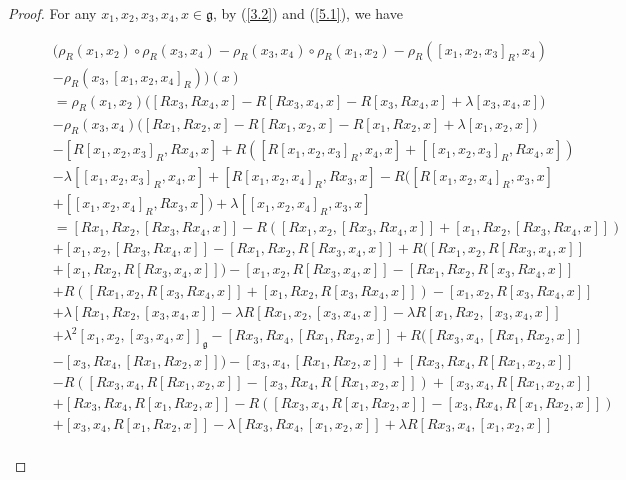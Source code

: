 \documentclass[12pt]{amsart}
\theoremstyle{definition}
\begin{document}
\begin{proof}
For any $x_1, x_2, x_3, x_4, x\in \mathfrak{g}$, by (\ref{3.2}) and (\ref{5.1}),   we have
\begin{small}
\begin{align*}
&\big(\rho_R(x_1, x_2)\circ\rho_R(x_3, x_4)-\rho_R(x_3, x_4)\circ \rho_R(x_1, x_2)-\rho_R([x_1, x_2, x_3]_R, x_4)\\
\quad\quad &-\rho_R(x_3, [x_1, x_2, x_4]_R)\big)(x)\\
&=\rho_R(x_1, x_2)\big([Rx_3,Rx_4, x]-R[Rx_3, x_4, x]-R[x_3, Rx_4, x]+\lambda[x_3, x_4, x]\big)\\
\quad\quad &-\rho_R(x_3, x_4)\big([Rx_1,Rx_2, x]-R[Rx_1, x_2, x]-R[x_1, Rx_2, x]+\lambda[x_1, x_2, x]\big)\\
\quad\quad & -[R[x_1,x_2,x_3]_R, Rx_4, x]+R( [R[x_1,x_2,x_3]_R, x_4, x]+[[x_1, x_2, x_3]_R, Rx_4, x]) \\
\quad\quad &-\lambda [[x_1,x_2,x_3]_R, x_4, x] +[R[x_1,x_2,x_4]_R, Rx_3, x]-R( [R[x_1,x_2,x_4]_R, x_3, x]\\
\quad\quad &+[[x_1, x_2, x_4]_R, Rx_3, x])+\lambda [[x_1,x_2,x_4]_R, x_3, x]\\
&=[Rx_1,Rx_2, [Rx_3,Rx_4, x]]-R([Rx_1, x_2, [Rx_3,Rx_4, x]]+[x_1, Rx_2, [Rx_3,Rx_4, x]])\\
\quad\quad&+[x_1, x_2, [Rx_3,Rx_4, x]]-[Rx_1,Rx_2, R[Rx_3, x_4, x]]+R([Rx_1, x_2, R[Rx_3, x_4, x]]\\
\quad\quad&+[x_1, Rx_2, R[Rx_3, x_4, x]])-[x_1, x_2, R[Rx_3, x_4, x]]-[Rx_1,Rx_2, R[x_3, Rx_4, x]]\\
\quad\quad&+R([Rx_1, x_2, R[x_3, Rx_4, x]]+[x_1, Rx_2, R[x_3, Rx_4, x]])-[x_1, x_2, R[x_3, Rx_4, x]]\\
\quad\quad&+\lambda[Rx_1,Rx_2, [x_3, x_4, x]]-\lambda R[Rx_1, x_2, [x_3, x_4, x]]-\lambda R[x_1, Rx_2, [x_3, x_4, x]]\\
\quad\quad&+\lambda^2[x_1, x_2, [x_3, x_4, x]]_\mathfrak{g}-[Rx_3,Rx_4, [Rx_1,Rx_2, x]]+R([Rx_3, x_4, [Rx_1,Rx_2, x]]\\
\quad\quad&-[x_3, Rx_4, [Rx_1,Rx_2, x]])-[x_3, x_4, [Rx_1,Rx_2, x]]+[Rx_3,Rx_4, R[Rx_1, x_2, x]]\\
\quad\quad&-R([Rx_3, x_4, R[Rx_1, x_2, x]]-[x_3, Rx_4, R[Rx_1, x_2, x]])+[x_3, x_4, R[Rx_1, x_2, x]]\\
\quad\quad&+[Rx_3,Rx_4, R[x_1, Rx_2, x]]-R([Rx_3, x_4, R[x_1, Rx_2, x]]-[x_3, Rx_4, R[x_1, Rx_2, x]])\\
\quad\quad&+[x_3, x_4, R[x_1, Rx_2, x]]-\lambda[Rx_3,Rx_4, [x_1, x_2, x]]+\lambda R[Rx_3, x_4, [x_1, x_2, x]]\\

\end{align*}
\end{small}
\end{proof}
\end{document}

